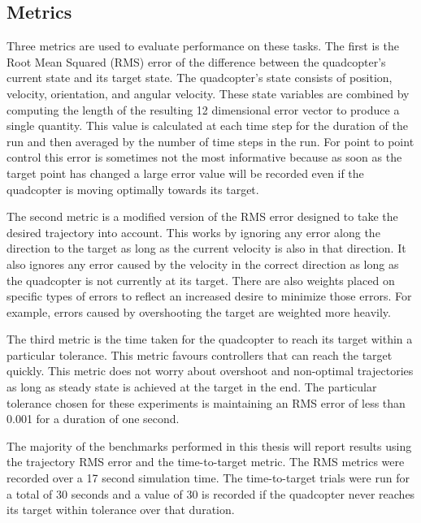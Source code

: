 \documentclass[letterpaper,12pt,titlepage,oneside,final]{book}
\begin{document}
\subsection{Metrics}

Three metrics are used to evaluate performance on these tasks. 
The first is the Root Mean Squared (RMS) error of the difference between the quadcopter's current state and its target state.
The quadcopter's state consists of position, velocity, orientation, and angular velocity.
These state variables are combined by computing the length of the resulting 12 dimensional error vector to produce a single quantity.
This value is calculated at each time step for the duration of the run and then averaged by the number of time steps in the run.
For point to point control this error is sometimes not the most informative because as soon as the target point has changed a large error value will be recorded even if the quadcopter is moving optimally towards its target.

The second metric is a modified version of the RMS error designed to take the desired trajectory into account.
This works by ignoring any error along the direction to the target as long as the current velocity is also in that direction.
It also ignores any error caused by the velocity in the correct direction as long as the quadcopter is not currently at its target.
There are also weights placed on specific types of errors to reflect an increased desire to minimize those errors.
For example, errors caused by overshooting the target are weighted more heavily.

The third metric is the time taken for the quadcopter to reach its target within a particular tolerance. 
This metric favours controllers that can reach the target quickly.
This metric does not worry about overshoot and non-optimal trajectories as long as steady state is achieved at the target in the end.
The particular tolerance chosen for these experiments is maintaining an RMS error of less than 0.001 for a duration of one second.

The majority of the benchmarks performed in this thesis will report results using the trajectory RMS error and the time-to-target metric.
The RMS metrics were recorded over a 17 second simulation time.
The time-to-target trials were run for a total of 30 seconds and a value of 30 is recorded if the quadcopter never reaches its target within tolerance over that duration.
\end{document}
